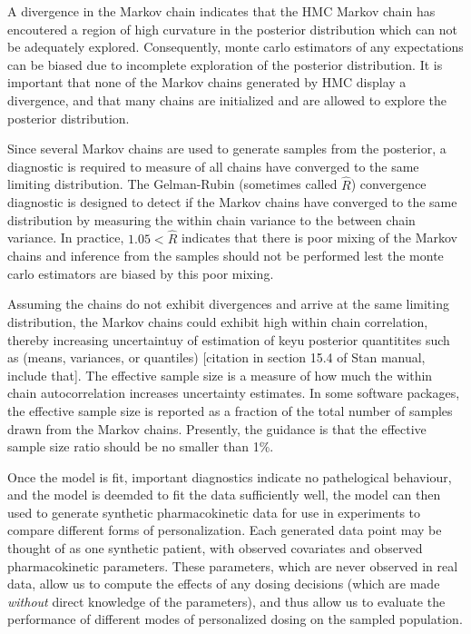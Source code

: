 A divergence in the Markov chain indicates that the HMC Markov chain has encoutered a region of high curvature in the posterior distribution which can not be adequately explored.  Consequently, monte carlo estimators of any expectations can be biased due to incomplete exploration of the posterior distribution.  It is important that none of the Markov chains generated by HMC display a divergence, and that many chains are initialized and are allowed to explore the posterior distribution.

Since several Markov chains are used to generate samples from the posterior, a diagnostic is required to measure of all chains have converged to the same limiting distribution.  The Gelman-Rubin (sometimes called $\hat{R}$) convergence diagnostic is designed to detect if the Markov chains have converged to the same distribution by measuring the within chain variance to the between chain variance. In practice, $1.05<\hat{R}$ indicates that there is poor mixing of the Markov chains and inference from the samples should not be performed lest the monte carlo estimators are biased by this poor mixing.

Assuming the chains do not exhibit divergences and arrive at the same limiting distribution, the Markov chains could exhibit high within chain correlation, thereby increasing uncertaintuy of estimation of keyu posterior quantitites such as (means, variances, or quantiles) [citation in section 15.4 of Stan manual, include that].  The effective sample size is a measure of how much the within chain autocorrelation increases uncertainty estimates.  In some software packages, the effective sample size is reported as a fraction of the total number of samples drawn from the Markov chains.  Presently, the guidance is that the effective sample size ratio should be no smaller than 1\%.

Once the model is fit, important diagnostics indicate no pathelogical behaviour, and the model is deemded to fit the data sufficiently well, the model can then used to generate synthetic pharmacokinetic data for use in experiments to compare different forms of personalization. Each generated data point may be thought of as one synthetic patient, with observed covariates and observed pharmacokinetic parameters. These parameters, which are never observed in real data, allow us to compute the effects of any dosing decisions (which are made \textit{without} direct knowledge of the parameters), and thus allow us to evaluate the performance of different modes of personalized dosing on the sampled population. 


